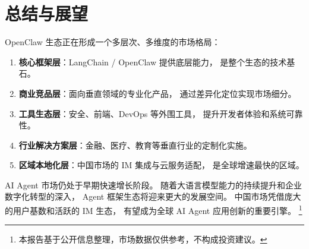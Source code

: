 \documentclass[
  customlatinfont = macos,
]{hkustthesis}
\begin{document}
\section{总结与展望}

OpenClaw 生态正在形成一个多层次、多维度的市场格局：

\begin{enumerate}[nosep]
  \item \textbf{核心框架层}：LangChain / OpenClaw 提供底层能力，
        是整个生态的技术基石。
  \item \textbf{商业竞品层}：面向垂直领域的专业化产品，
        通过差异化定位实现市场细分。
  \item \textbf{工具生态层}：安全、前端、DevOps 等外围工具，
        提升开发者体验和系统可靠性。
  \item \textbf{行业解决方案层}：金融、医疗、教育等垂直行业的定制化实施。
  \item \textbf{区域本地化层}：中国市场的 IM 集成与云服务适配，
        是全球增速最快的区域。
\end{enumerate}

AI Agent 市场仍处于早期快速增长阶段。
随着大语言模型能力的持续提升和企业数字化转型的深入，
Agent 框架生态将迎来更大的发展空间。
中国市场凭借庞大的用户基数和活跃的 IM 生态，
有望成为全球 AI Agent 应用创新的重要引擎。%
\footnote{本报告基于公开信息整理，市场数据仅供参考，不构成投资建议。}


\printbibliography[heading=bibintoc, title={参考文献}]
\end{document}
